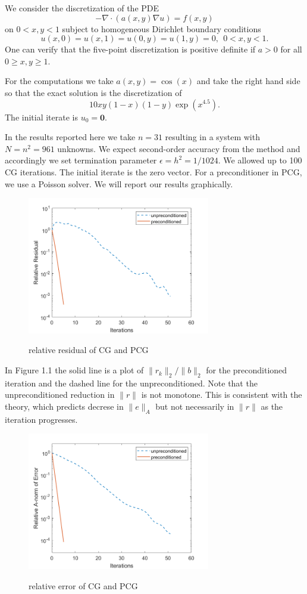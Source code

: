 \begin{exm}
  We consider the discretization of the PDE
  \begin{equation}
    \label{eq:2.35}
    -\nabla\cdot(a(x,y)\nabla u)= f(x,y)
  \end{equation}
  on $0<x,y<1$ subject to homogeneous Dirichlet boundary conditions
  $$u(x,0)=u(x,1)=u(0,y)=u(1,y)=0,\ \ 0<x,y<1.$$
  One can verify that the five-point discretization is positive definite if $a>0$
  for all $0\geq x,y\geq 1$.

  For the computations we take $a(x,y)=\cos(x)$ and take the right
  hand side so that the exact solution is the discretization of
  $$10xy(1-x)(1-y)\exp(x^{4.5}).$$
  The initial iterate is $u_0=\mathbf{0}.$

  In the results reported here we take $n=31$ resulting in a system
  with $N=n^2=961$ unknowns. We expect second-order accuracy from the
  method and accordingly we set termination parameter
  $\epsilon=h^2=1/1024$.
  We allowed up to 100 CG iterations. The initial iterate is the zero
  vector. For a preconditioner in PCG, we use a Poisson solver. We will
  report our results graphically.

  \begin{figure}[H]
    \centering\label{fig:2.7.1}
    \includegraphics[height=6cm]{2_7_1.png}
    \caption{relative residual of CG and PCG }
  \end{figure}

  In Figure 1.1 the solid line is a plot of $\|r_k\|_2/\|b\|_2$
  for the preconditioned iteration and the dashed line for the
  unpreconditioned. Note that the unpreconditioned reduction in
  $\|r\|$ is not monotone. This is consistent  
  with the theory, which predicts decrese in $\|e\|_A$ but not
  necessarily in $\|r\|$ as the iteration progresses.
  
  \begin{figure}[H]
    \centering\label{fig:2.7.2}
    \includegraphics[height=6cm]{2_7_2.png}
    \caption{relative error of CG and PCG }
  \end{figure}
  

\end{exm}
